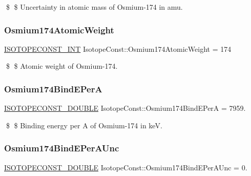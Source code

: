 \$ \$ Uncertainty in atomic mass of Osmium-\/174 in amu. \mbox{\label{group___isotope_const-_osmium-_os174_ga3e7c4146389ab22f114f5f027d841e39}} 
\subsubsection{\texorpdfstring{Osmium174\+Atomic\+Weight}{Osmium174AtomicWeight}}
{\footnotesize\ttfamily \mbox{\hyperlink{group___isotope_const-_macros_ga5f18360b3e99483a35c32d789e62621c}{I\+S\+O\+T\+O\+P\+E\+C\+O\+N\+S\+T\+\_\+\+I\+NT}} Isotope\+Const\+::\+Osmium174\+Atomic\+Weight = 174}

\$ \$ Atomic weight of Osmium-\/174. \mbox{\label{group___isotope_const-_osmium-_os174_ga181b7488451f774132b7179ccad6836a}} 
\subsubsection{\texorpdfstring{Osmium174\+Bind\+E\+PerA}{Osmium174BindEPerA}}
{\footnotesize\ttfamily \mbox{\hyperlink{group___isotope_const-_macros_ga8f45a7272ce02c0b4c65c44636ed719a}{I\+S\+O\+T\+O\+P\+E\+C\+O\+N\+S\+T\+\_\+\+D\+O\+U\+B\+LE}} Isotope\+Const\+::\+Osmium174\+Bind\+E\+PerA = 7959.}

\$ \$ Binding energy per A of Osmium-\/174 in keV. \mbox{\label{group___isotope_const-_osmium-_os174_ga2fec4dd4e2007354b9e89197fc709a5f}} 
\subsubsection{\texorpdfstring{Osmium174\+Bind\+E\+Per\+A\+Unc}{Osmium174BindEPerAUnc}}
{\footnotesize\ttfamily \mbox{\hyperlink{group___isotope_const-_macros_ga8f45a7272ce02c0b4c65c44636ed719a}{I\+S\+O\+T\+O\+P\+E\+C\+O\+N\+S\+T\+\_\+\+D\+O\+U\+B\+LE}} Isotope\+Const\+::\+Osmium174\+Bind\+E\+Per\+A\+Unc = 0.}

